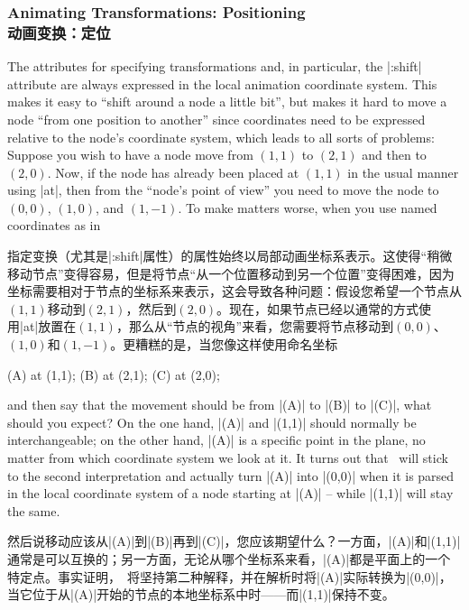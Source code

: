 \subsubsection{Animating Transformations: Positioning\\动画变换：定位}

The attributes for specifying transformations and, in particular, the |:shift|
attribute are always expressed in the local animation coordinate system. This
makes it easy to ``shift around a node a little bit'', but makes it hard to
move a node ``from one position to another'' since coordinates need to be
expressed relative to the node's coordinate system, which leads to all sorts of
problems: Suppose you wish to have a node move from $(1,1)$ to $(2,1)$ and then
to $(2,0)$. Now, if the node has already been placed at $(1,1)$ in the usual
manner using |at|, then from the ``node's point of view'' you need to move the
node to $(0,0)$, $(1,0)$, and $(1,-1)$. To make matters worse, when you use
named coordinates as in

指定变换（尤其是|:shift|属性）的属性始终以局部动画坐标系表示。这使得“稍微移动节点”变得容易，但是将节点“从一个位置移动到另一个位置”变得困难，因为坐标需要相对于节点的坐标系来表示，这会导致各种问题：假设您希望一个节点从$(1,1)$移动到$(2,1)$，然后到$(2,0)$。现在，如果节点已经以通常的方式使用|at|放置在$(1,1)$，那么从“节点的视角”来看，您需要将节点移动到$(0,0)$、$(1,0)$和$(1,-1)$。更糟糕的是，当您像这样使用命名坐标


\begin{codeexample}
\coordinate(A) at (1,1);
\coordinate(B) at (2,1);
\coordinate(C) at (2,0);
\end{codeexample}
%
and then say that the movement should be from |(A)| to |(B)| to |(C)|, what
should you expect? On the one hand, |(A)| and |(1,1)| should normally be
interchangeable; on the other hand, |(A)| is a specific point in the plane, no
matter from which coordinate system we look at it. It turns out that \tikzname\
will stick to the second interpretation and actually turn |(A)| into |(0,0)|
when it is parsed in the local coordinate system of a node starting at |(A)| --
while |(1,1)| will stay the same.

然后说移动应该从|(A)|到|(B)|再到|(C)|，您应该期望什么？一方面，|(A)|和|(1,1)|通常是可以互换的；另一方面，无论从哪个坐标系来看，|(A)|都是平面上的一个特定点。事实证明，\tikzname\ 将坚持第二种解释，并在解析时将|(A)|实际转换为|(0,0)|，当它位于从|(A)|开始的节点的本地坐标系中时——而|(1,1)|保持不变。

